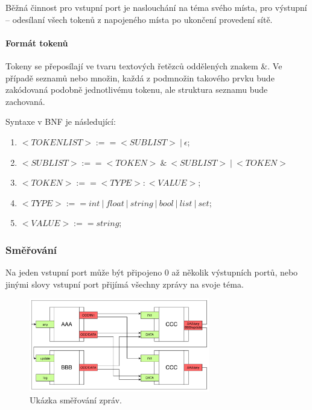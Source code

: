 Běžná činnost pro vstupní port je naslouchání na téma svého místa, pro výstupní -- odesílaní všech tokenů z napojeného místa po ukončení provedení sítě.

\paragraph{Formát tokenů}
\label{par:token-format}

Tokeny se přeposílají ve tvaru textových řetězců  oddělených znakem \&. Ve případě seznamů nebo množin, každá z podmnožin takového prvku bude zakódovaná podobně jednotlivému tokenu, ale struktura seznamu bude zachovaná.

Syntaxe v BNF je následující:
\begin{enumerate}
  \item $<TOKENLIST> :== <SUBLIST> \:\vert\: \epsilon$;
  \item $<SUBLIST> :==  <TOKEN> \:\&\: <SUBLIST> \:\vert\: <TOKEN>$
  \item $<TOKEN> :== <TYPE>:<VALUE> $;
  \item $<TYPE> :== int\:\vert\:float\:\vert\:string\:\vert\:bool\:\vert\:list\:\vert\:set $;
  \item $<VALUE> :== string$;
\end{enumerate}

\subsubsection{Směřování}
\label{subsec:mqtt-routing}

Na jeden vstupní port může být připojeno 0 až několik výstupních portů, nebo jinými slovy vstupní port přijímá všechny zprávy na svoje téma.

\begin{figure}[htb]
 \centering
 \includegraphics[width=0.7\textwidth]{obrazky-figures/Port-routing.pdf}
 \caption{Ukázka směřování zpráv.}
 \label{route-viz}
\end{figure}

